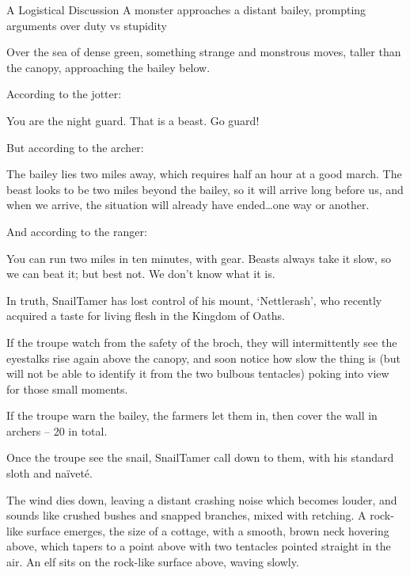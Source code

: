 
{A Logistical Discussion}%
{A monster approaches a distant bailey, prompting arguments over duty vs stupidity}%

Over the sea of dense green, something strange and monstrous moves, taller than the canopy, approaching the bailey below.

According to the \gls{jotter}:

\begin{speechtext}
  You are the night guard.  That is a beast.  Go guard!
\end{speechtext}

But according to the archer:

\begin{speechtext}
  The bailey lies two miles away, which requires half an hour at a good march.
  The beast looks to be two miles beyond the bailey, so it will arrive long before us, and when we arrive, the situation will already have ended\ldots one way or another.
\end{speechtext}

And according to the ranger:

\begin{speechtext}
  You can run two miles in ten minutes, with gear.
  Beasts always take it slow, so we can beat it; but best not.
  We don't know what it is.
\end{speechtext}

In truth, \gls{SnailTamer} has lost control of his mount, `Nettlerash', who recently acquired a taste for living flesh in the Kingdom of Oaths.

If the troupe watch from the safety of the broch,
they will intermittently see the eyestalks rise again above the canopy, and soon notice how slow the thing is (but will not be able to identify it from the two bulbous tentacles) poking into view for those small moments.

If the troupe warn the bailey,
the farmers let them in, then cover the wall in archers -- 20 in total.

Once the troupe see the snail,
\gls{SnailTamer} call down to them, with his standard sloth and naïveté.

\begin{boxtext}
  The wind dies down, leaving a distant crashing noise which becomes louder, and sounds like crushed bushes and snapped branches, mixed with  retching.
  A rock-like surface emerges, the size of a cottage, with a smooth, brown neck hovering above, which tapers to a point above with two tentacles pointed straight in the air.
  An elf sits on the rock-like surface above, waving slowly.
\end{boxtext}

